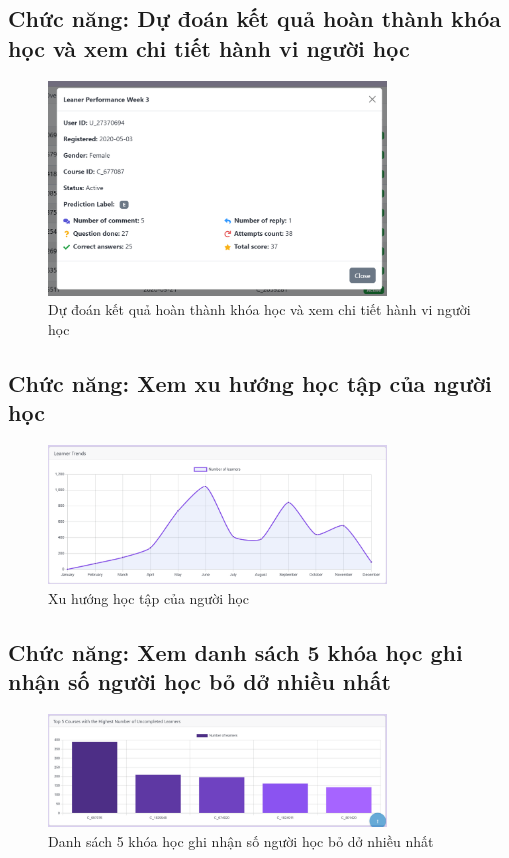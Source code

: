 \subsection{Chức năng: Dự đoán kết quả hoàn thành khóa học và xem chi tiết hành vi người học}
\begin{figure}[H]
    \centering
    \includegraphics[width = 0.8\textwidth]{imgs/demo-2.png}
    \caption{Dự đoán kết quả hoàn thành khóa học và xem chi tiết hành vi người học}
    \label{fig:demo-2}
\end{figure}
\subsection{Chức năng: Xem xu hướng học tập của người học}
\begin{figure}[H]
    \centering
    \includegraphics[width = 0.8\textwidth]{imgs/demo-3.png}
    \caption{Xu hướng học tập của người học}
    \label{fig:demo-3}
\end{figure}
\subsection{Chức năng: Xem danh sách 5 khóa học ghi nhận số người học bỏ dở nhiều nhất}
\begin{figure}[H]
    \centering
    \includegraphics[width = 0.8\textwidth]{imgs/demo-4.png}
    \caption{Danh sách 5 khóa học ghi nhận số người học bỏ dở nhiều nhất}
    \label{fig:demo-4}
\end{figure}
